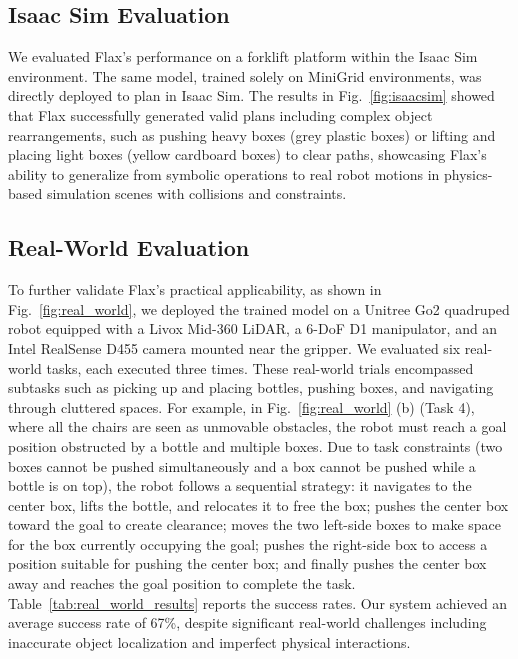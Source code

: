 \documentclass[letterpaper, 10pt, journal, twoside]{IEEEtran}
\newcommand{\fref}[1]{Fig.~\ref{#1}}
\newcommand{\tref}[1]{Table~\ref{#1}}
\newcommand{\shortname}{Flax\xspace}
\begin{document}
\subsection{Isaac Sim Evaluation} 
We evaluated \shortname's performance on a forklift platform within the Isaac Sim environment. 
The same model, trained solely on MiniGrid environments, was directly deployed to plan in Isaac Sim. 
The results in \fref{fig:isaacsim} showed that \shortname successfully generated valid plans including complex object rearrangements, such as pushing heavy boxes (grey plastic boxes) or lifting and placing light boxes (yellow cardboard boxes) to clear paths, showcasing \shortname's ability to generalize from symbolic operations to real robot motions in physics-based simulation scenes with collisions and constraints.

\subsection{Real-World Evaluation}
To further validate \shortname's practical applicability, as shown in \fref{fig:real_world}, we deployed the trained model on a Unitree Go2 quadruped robot equipped with a Livox Mid-360 LiDAR, a 6-DoF D1 manipulator, and an Intel RealSense D455 camera mounted near the gripper. 
We evaluated six real-world tasks, each executed three times.
These real-world trials encompassed subtasks such as picking up and placing bottles, pushing boxes, and navigating through cluttered spaces. For example, in \fref{fig:real_world} (b) (Task 4), where all the chairs are seen as unmovable obstacles, the robot must reach a goal position obstructed by a bottle and multiple boxes. Due to task constraints (two boxes cannot be pushed simultaneously and a box cannot be pushed while a bottle is on top), the robot follows a sequential strategy:  it navigates to the center box, lifts the bottle, and relocates it to free the box;  pushes the center box toward the goal to create clearance;  moves the two left-side boxes to make space for the box currently occupying the goal;  pushes the right-side box to access a position suitable for pushing the center box; and  finally pushes the center box away and reaches the goal position to complete the task.
\tref{tab:real_world_results} reports the success rates. Our system achieved an average success rate of 67\%, despite significant real-world challenges including inaccurate object localization and imperfect physical interactions.
\end{document}
